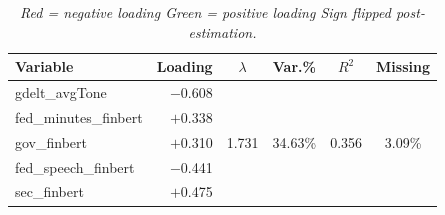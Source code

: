\documentclass[10pt]{article}
\begin{document}
\begin{table}[h!]
\centering
\begin{tabular}{lrcccc}
\toprule
\textbf{Variable}
  & \textbf{Loading}
  & \textbf{$\lambda$}
  & \textbf{Var.\%}
  & \textbf{$R^{2}$}
  & \textbf{Missing} \\
\midrule

gdelt\_avgTone
  & \textcolor{redneg}{$-$0.608}
  & \multirow{5}{*}{1.731}
  & \multirow{5}{*}{34.63\%}
  & \multirow{5}{*}{0.356}
  & \multirow{5}{*}{3.09\%} \\

\rowcolor{rowgray}
fed\_minutes\_finbert & \textcolor{greenpos}{$+$0.338} &&&& \\

gov\_finbert          & \textcolor{greenpos}{$+$0.310} &&&& \\

\rowcolor{rowgray}
fed\_speech\_finbert  & \textcolor{redneg}{$-$0.441}   &&&& \\

sec\_finbert          & \textcolor{greenpos}{$+$0.475} &&&& \\

\bottomrule
\end{tabular}
\caption*{\footnotesize\itshape
  \textcolor{redneg}{Red} = negative loading\quad
  \textcolor{greenpos}{Green} = positive loading\quad
  Sign flipped post-estimation.}
\end{table}
\end{document}
